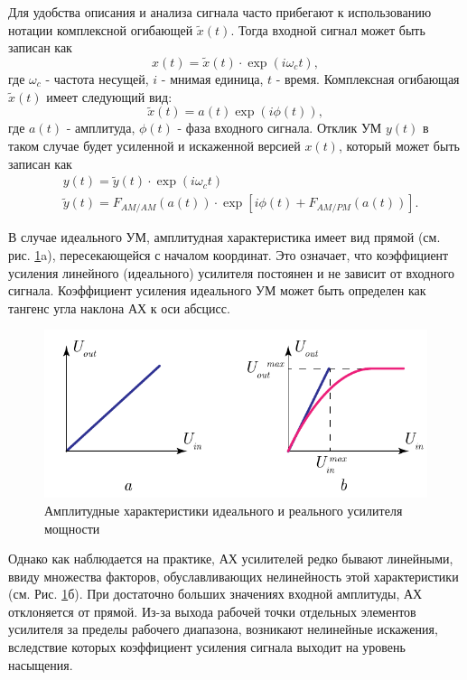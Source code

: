 Для удобства описания и анализа сигнала часто прибегают к использованию
нотации комплексной огибающей $\tilde{x}(t)$. Тогда входной сигнал может быть
записан как 
\begin{equation}
    x(t) = \tilde{x}(t) \cdot \exp(i \omega_c t),
\end{equation}
где $\omega_c$ - частота несущей, $i$ - мнимая единица, $t$ - время.
Комплексная огибающая $\tilde{x}(t)$ имеет следующий вид:
\begin{equation}
    \tilde{x}(t) = a(t) \exp(i\phi(t)),
\end{equation}
где $a(t)$ - амплитуда, $\phi(t)$ - фаза входного сигнала. Отклик УМ $y(t)$
в таком случае будет усиленной и искаженной версией $x(t)$, который может
быть записан как
\begin{equation}
    \begin{aligned}
        &y(t) = \tilde{y}(t) \cdot \exp(i \omega_c t)\\
        &\tilde{y}(t) = F_{AM/AM}(a(t)) \cdot \exp[i \phi(t) + F_{AM/PM}(a(t))].
    \end{aligned}
    \label{eq:pa_distortion}
\end{equation}

В случае идеального УМ, амплитудная характеристика имеет вид прямой (см.
рис. \ref{fig:1.1}a), пересекающейся с началом координат. Это означает, что
коэффициент усиления линейного (идеального) усилителя постоянен и не
зависит от входного сигнала. Коэффициент усиления идеального УМ может быть
определен как тангенс угла наклона АХ к оси абсцисс.

\begin{figure}[h!]
    \centering
    \includegraphics[width=0.8\linewidth]{figs/amp_char.pdf}
    \caption{Амплитудные характеристики идеального и реального усилителя мощности}
    \label{fig:1.1}
\end{figure}

Однако как наблюдается на практике, АХ усилителей редко бывают линейными,
ввиду множества факторов, обуславливающих нелинейность этой характеристики
(см. Рис. \ref{fig:1.1}б). При достаточно больших значениях входной
амплитуды, АХ отклоняется от прямой. Из-за выхода рабочей точки
отдельных элементов усилителя за пределы рабочего диапазона, возникают
нелинейные искажения, вследствие которых коэффициент усиления сигнала
выходит на уровень насыщения.

